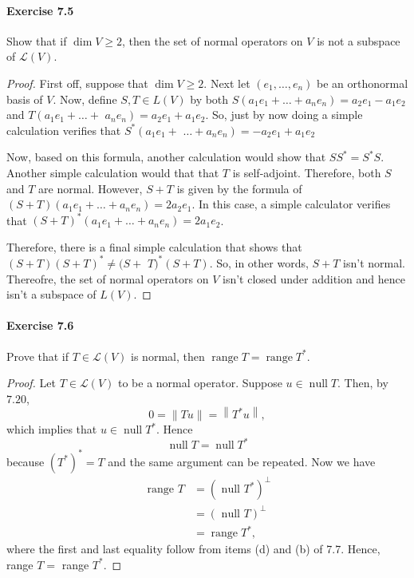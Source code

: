 \documentclass{article}
\theoremstyle{definition}
\begin{document}
\paragraph{Exercise 7.5} Show that if $\operatorname{dim} V \geq 2$, then the set of normal operators on $V$ is not a subspace of $\mathcal{L}(V)$.
\begin{proof}
    First off, suppose that $\operatorname{dim} V \geq 2$. Next let $\left(e_1, \ldots, e_n\right)$ be an orthonormal basis of $V$. Now, define $S, T \in L(V)$ by both $S\left(a_1 e_1+\ldots+a_n e_n\right)=a_2 e_1-a_1 e_2$ and $T\left(a_1 e_1+\ldots+\right.$ $\left.a_n e_n\right)=a_2 e_1+a_1 e_2$. So, just by now doing a simple calculation verifies that $S^*\left(a_1 e_1+\right.$ $\left.\ldots+a_n e_n\right)=-a_2 e_1+a_1 e_2$

Now, based on this formula, another calculation would show that $S S^*=S^* S$. Another simple calculation would that that $T$ is self-adjoint. Therefore, both $S$ and $T$ are normal. However, $S+T$ is given by the formula of $(S+T)\left(a_1 e_1+\ldots+a_n e_n\right)=2 a_2 e_1$. In this case, a simple calculator verifies that $(S+T)^*\left(a_1 e_1+\ldots+a_n e_n\right)=2 a_1 e_2$.

Therefore, there is a final simple calculation that shows that $(S+T)(S+T)^* \neq(S+$ $T)^*(S+T)$. So, in other words, $S+T$ isn't normal. Thereofre, the set of normal operators on $V$ isn't closed under addition and hence isn't a subspace of $L(V)$.
\end{proof}



\paragraph{Exercise 7.6} Prove that if $T \in \mathcal{L}(V)$ is normal, then $\operatorname{range} T=\operatorname{range} T^{*}.$
\begin{proof}
    Let $T \in \mathcal{L}(V)$ to be a normal operator.
Suppose $u \in \operatorname{null} T$. Then, by $7.20$,
$$
0=\|T u\|=\left\|T^* u\right\|,
$$
which implies that $u \in \operatorname{null} T^*$.
Hence
$$
\operatorname{null} T=\operatorname{null} T^*
$$
because $\left(T^*\right)^*=T$ and the same argument can be repeated.
Now we have
$$
\begin{aligned}
\text { range } T & =\left(\text { null } T^*\right)^{\perp} \\
& =(\text { null } T)^{\perp} \\
& =\operatorname{range} T^*,
\end{aligned}
$$
where the first and last equality follow from items (d) and (b) of 7.7.
Hence, range $T=$ range $T^*$.
\end{proof}
\end{document}

